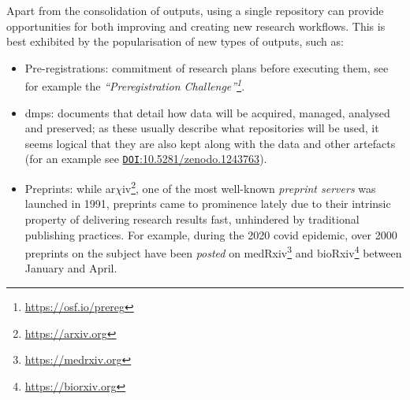 Apart from the consolidation of outputs, using a single repository can provide opportunities for both improving and creating new research workflows. This is best exhibited by the popularisation of new types of outputs, such as:
\begin{itemize}
    \item Pre-registrations: commitment of research plans before executing them, see for example the \emph{``Preregistration Challenge''\footnote{\url{https://osf.io/prereg}}}.
    \item \glspl{dmp}: documents that detail how data will be acquired, managed, analysed and preserved; as these usually describe what repositories will be used,  it seems logical that they are also kept along with the data and other artefacts (for an example see \href{https://doi.org/10.5281/zenodo.1243763}{\texttt{DOI}:10.5281/zenodo.1243763}).
    \item Preprints: while ar$\chi$iv\footnote{\url{https://arxiv.org}}, one of the most well-known \emph{preprint servers} was launched in 1991, preprints came to prominence lately due to their intrinsic property of delivering research results fast, unhindered by traditional publishing practices. For example, during the 2020 \gls{covid} epidemic, over 2000 preprints on the subject have been \emph{posted} on medRxiv\footnote{\url{https://medrxiv.org}} and bioRxiv\footnote{\url{https://biorxiv.org}} between January and April.
\end{itemize}

